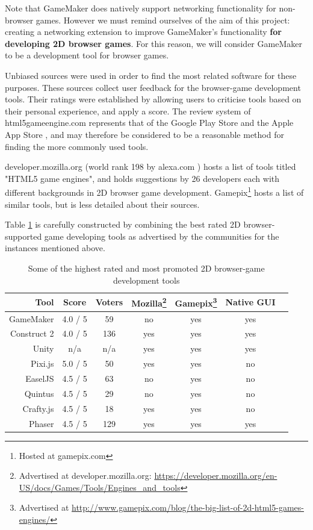 \documentclass[bsc, 12pt, twoside, singlespacing, parskip, abbrevs, notimes, normalheadings, logo, deptreport]{styles/infthesis}
\begin{document}
Note that GameMaker does natively support networking functionality for non-browser games. However we must remind ourselves of the aim of this project: creating a networking extension to improve GameMaker's functionality \textbf{for developing 2D browser games}. For this reason, we will consider GameMaker to be a development tool for browser games.

Unbiased sources were used in order to find the most related software for these purposes. These sources collect user feedback for the browser-game development tools. Their ratings were established by allowing users to criticise tools based on their personal experience, and apply a score. The review system of html5gameengine.com \cite{html5_gamedev_tools} represents that of the Google Play Store \cite{Google_Play_Store} and the Apple App Store \cite{Apple_App_Store}, and may therefore be considered to be a reasonable method for finding the more commonly used tools.

developer.mozilla.org \cite{html5_mozilla} (world rank 198 by alexa.com \cite{alexa_ranking}) hosts a list of tools titled "HTML5 game engines", and holds suggestions by 26 developers each with different backgrounds in 2D browser game development. Gamepix\footnote{Hosted at gamepix.com} \cite{gamepix_engines} hosts a list of similar tools, but is less detailed about their sources.

Table \ref{table:Related_Tools} is carefully constructed by combining the best rated 2D browser-supported game developing tools as advertised by the communities for the instances mentioned above.

\begin{savenotes}
\begin{table}[H]
\centering
  \begin{tabular}{ | r || c | c | c | c | c | c | }
  	\hline
  	\textbf{Tool}			& \textbf{Score}		& \textbf{Voters}& \textbf{Mozilla}\footnote{Advertised at developer.mozilla.org: \url{https://developer.mozilla.org/en-US/docs/Games/Tools/Engines\_and\_tools}} 	& \textbf{Gamepix}\footnote{Advertised at \url{http://www.gamepix.com/blog/the-big-list-of-2d-html5-games-engines/}} 	& \textbf{Native GUI}\\ \hline\hline
	GameMaker		& 4.0 / 5	& 59	& no	& yes	& yes	\\ \hline
    Construct 2		& 4.0 / 5	& 136	& yes	& yes	& yes	\\ \hline    
    Unity			& n/a		& n/a	& yes	& yes	& yes	\\ \hline
    Pixi.js			& 5.0 / 5	& 50	& yes	& yes	& no	\\ \hline
    EaselJS			& 4.5 / 5	& 63	& no	& yes	& no	\\ \hline
    Quintus			& 4.5 / 5	& 29	& no	& yes	& no	\\ \hline
    Crafty.js		& 4.5 / 5	& 18	& yes	& yes	& no	\\ \hline
    Phaser			& 4.5 / 5	& 129	& yes	& yes	& yes	\\ \hline
  \end{tabular}
  \caption{Some of the highest rated and most promoted 2D browser-game development tools}
  \label{table:Related_Tools}
\end{table}%
\end{savenotes}
\end{document}
